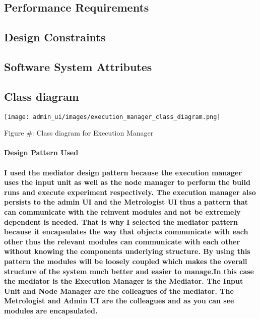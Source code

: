 \subsection{Performance Requirements}
\begin{itemize}
	
\end{itemize}
\subsection{Design Constraints}
\begin{enumerate}
	
\end{enumerate}
\subsection{Software System Attributes}



\subsection{Class diagram}
 \texttt{[image: admin\_ui/images/execution\_manager\_class\_diagram.png]}
	\begin{center}
	    \small{Figure #: Class diagram for Execution Manager}
    \end{center}
    
    \paragraph{\textbf{Design Pattern Used} \\ \\
	I used the mediator design pattern because the execution manager uses the input unit as well as the node manager to perform the build runs and execute experiment respectively. The execution manager also persists to the admin UI and the Metrologist UI thus a pattern that can communicate with the reinvent modules and not be extremely dependent is needed. That is why I selected the mediator pattern because it encapsulates the way that objects communicate with each other thus the relevant modules can communicate with each other without knowing the components underlying structure. By using this pattern the modules will be loosely coupled which makes the overall structure of the system much better and easier to manage.In this case the mediator is the \textbf{Execution Manager}  is the Mediator. The \textbf{Input Unit} and \textbf{Node Manager } are the colleagues of the mediator. The \textbf{Metrologist} and \textbf{Admin UI} are the colleagues and as you can see modules are encapsulated.}
		
